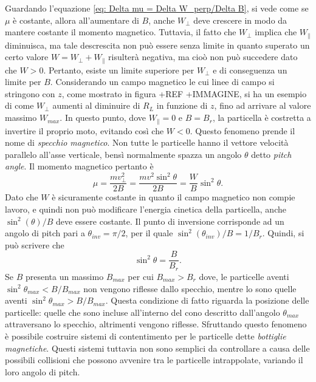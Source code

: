 Guardando l'equazione \eqref{eq: Delta mu = Delta W_perp/Delta B}, si vede come se $\mu$ è costante, allora all'aumentare di $B$, anche $W_\perp$ deve crescere in modo da mantere costante il momento magnetico. Tuttavia, il fatto che $W_\perp$ implica che $W_\parallel$ diminuisca, ma tale descrescita non può essere senza limite in quanto superato un certo valore $W = W_\perp + W_\parallel$ risulterà negativa, ma cioò non può succedere dato che $W > 0$. Pertanto, esiste un limite superiore per $W_\perp$ e di conseguenza un limite per $B$. Considerando un campo magnetico le cui linee di campo si stringono con $z$, come mostrato in figura +REF +IMMAGINE, si ha un esempio di come $W_\perp$ aumenti al diminuire di $R_L$ in funzione di $z$, fino ad arrivare al valore massimo $W_{max}$. In questo punto, dove $W_\parallel = 0$ e $B = B_r$, la particella è costretta a invertire il proprio moto, evitando così che $W < 0$. Questo fenomeno prende il nome di \emph{specchio magnetico}. Non tutte le particelle hanno il vettore velocità parallelo all'asse verticale, bensì normalmente spazza un angolo $\theta$ detto \emph{pitch angle}. Il momento magnetico pertanto è
\begin{equation}
    \mu = \frac{mv_\perp^2}{2B} = \frac{mv^2\sin^2{\theta}}{2B} = \frac{W}{B}\sin^2{\theta}.
\end{equation}
Dato che $W$ è sicuramente costante in quanto il campo magnetico non compie lavoro, e quindi non può modificare l'energia cinetica della particella, anche $\sin^2{(\theta)}/B$ deve essere costante. Il punto di inversione corrisponde ad un angolo di pitch pari a $\theta_{inv} = \pi/2$, per il quale $\sin^2{(\theta_{inv})}/B = 1/B_r$. Quindi, si può scrivere che 
\begin{equation}
    \sin^2{\theta} = \frac{B}{B_r}.
\end{equation}
Se $B$ presenta un massimo $B_{max}$ per cui $B_{max} > B_r$ dove, le particelle aventi $\sin^2{\theta_{max}} < B/B_{max}$ non vengono riflesse dallo specchio, mentre lo sono quelle aventi $\sin^2{\theta_{max}} > B/B_{max}$. Questa condizione di fatto riguarda la posizione delle particelle: quelle che sono incluse all'interno del cono descritto dall'angolo $\theta_{max}$ attraversano lo specchio, altrimenti vengono riflesse. Sfruttando questo fenomeno è possibile costruire sistemi di contentimento per le particelle dette \emph{bottiglie magnetiche}. Questi sistemi tuttavia non sono semplici da controllare a causa delle possibili collisioni che possono avvenire tra le particelle intrappolate, variando il loro angolo di pitch. 